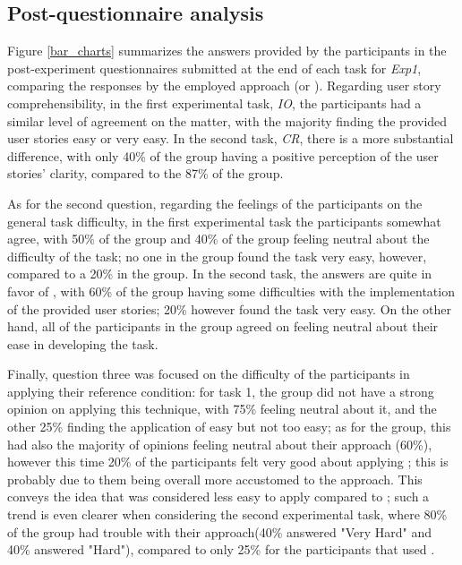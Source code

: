 \subsection{Post-questionnaire analysis}
Figure \ref{bar_charts} summarizes the answers provided by the participants in the post-experiment questionnaires submitted at the end of each task for \textit{Exp1}, comparing the responses by the employed approach (\tdd or \notdd).
Regarding user story comprehensibility, in the first experimental task, \textit{IO}, the participants had a similar level of agreement on the matter, with the majority finding the provided user stories easy or very easy. In the second task, \textit{CR}, there is a more substantial difference, with only 40\% of the \tdd group having a positive perception of the user stories' clarity, compared to the 87\% of the \notdd group.

As for the second question, regarding the feelings of the participants on the general task difficulty, in the first experimental task the participants somewhat agree, with 50\% of the \tdd group and 40\% of the \notdd group feeling neutral about the difficulty of the task; no one in the \tdd group found the task very easy, however, compared to a 20\% in the \notdd group. In the second task, the answers are quite in favor of \notdd, with 60\% of the \tdd group having some difficulties with the implementation of the provided user stories; 20\% however found the task very easy. On the other hand, all of the participants in the \notdd group agreed on feeling neutral about their ease in developing the task.

Finally, question three was focused on the difficulty of the participants in applying their reference condition: for task 1, the \tdd group did not have a strong opinion on applying this technique, with 75\% feeling neutral about it, and the other 25\% finding the application of \tdd easy but not too easy; as for the \notdd group, this had also the majority of opinions feeling neutral about their approach (60\%), however this time 20\% of the participants felt very good about applying \notdd; this is probably due to them being overall more accustomed to the approach. This conveys the idea that \tdd was considered less easy to apply compared to \notdd; such a trend is even clearer when considering the second experimental task, where 80\% of the \tdd group had trouble with their approach(40\% answered "Very Hard" and 40\% answered "Hard"), compared to only 25\% for the participants that used \notdd.



